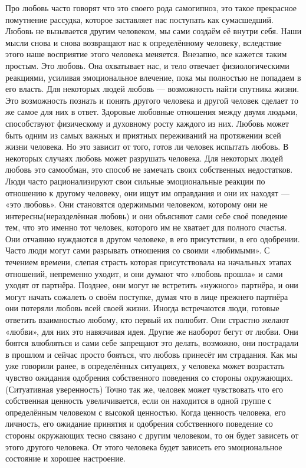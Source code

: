Про любовь часто говорят что это своего рода самогипноз, это такое прекрасное помутнение рассудка, которое заставляет нас поступать как сумасшедший. Любовь не вызывается другим человеком, мы сами создаём её внутри себя. Наши мысли снова и снова возвращают нас к определённому человеку, вследствие этого наше восприятие этого человека меняется. Внезапно, все кажется таким простым. Это любовь. Она охватывает нас, и тело отвечает физиологическими реакциями, усиливая эмоциональное влечение, пока мы полностью не попадаем в его власть. Для некоторых людей любовь --- возможность найти спутника жизни. Это возможность познать и понять другого человека и другой человек сделает то же самое для них в ответ. Здоровые любовные отношения между двумя людьми, способствуют физическому и духовному росту каждого из них. Любовь может быть одним из самых важных и приятных переживаний на протяжении всей жизни человека. Но это зависит от того, готов ли человек испытать любовь. В некоторых случаях любовь может разрушать человека. Для некоторых людей любовь это самообман, это способ не замечать своих собственных недостатков. Люди часто рационализируют свои сильные эмоциональные реакции по отношению к другому человеку, они ищут им оправдания и они их находят --- «это любовь». Они становятся одержимыми человеком, которому они не интересны(неразделённая любовь) и они объясняют сами себе своё поведение тем, что это именно тот человек, которого им не хватает для полного счастья. Они отчаянно нуждаются в другом человеке, в его присутствии, в его одобрении. Часто люди могут сами разрывать отношения со своими «любимыми». С течением времени, слепая страсть которая присутствовала на начальных этапах отношений, непременно уходит, и они думают что «любовь прошла» и сами уходят от партнёра. Позднее, они могут не встретить «нужного» партнёра, и они могут начать сожалеть о своём поступке, думая что в лице прежнего партнёра они потеряли любовь всей своей жизни. Иногда встречаются люди, готовые ответить взаимностью любому, кто первый их полюбит. Они страстно желают «любви», для них это навязчивая идея. Другие же наоборот бегут от любви. Они боятся влюбляться и сами себе запрещают это делать, возможно, они пострадали в прошлом и сейчас просто бояться, что любовь принесёт им страдания. Как мы уже говорили ранее, в определённых ситуациях, у человека может возрастать чувство ожидания одобрения собственного поведения со стороны окружающих. (Ситуативная уверенность) Точно так же, человек может чувствовать что его собственная ценность увеличивается, если он находится в одной группе с определённым человеком с высокой ценностью. Когда ценность человека, его личность, его ожидание принятия и одобрения собственного поведение со стороны окружающих тесно связано с другим человеком, то он будет зависеть от этого другого человека. От этого человека будет зависеть его эмоциональное состояние и хорошее настроение.

